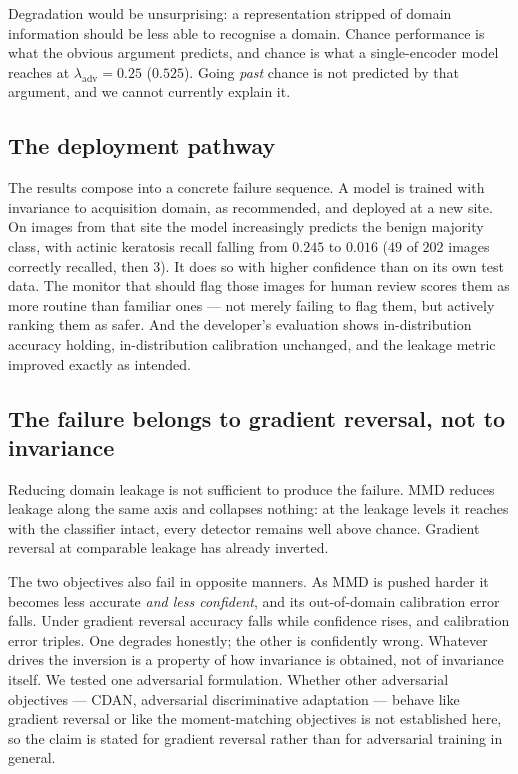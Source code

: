 \documentclass[11pt,a4paper]{article}
\newcommand{\lam}{\lambda_{\mathrm{adv}}}
\newcommand{\nAK}{202}      %
\begin{document}
Degradation would be unsurprising: a representation stripped of domain
information should be less able to recognise a domain. Chance performance is
what the obvious argument predicts, and chance is what a single-encoder model
reaches at $\lam = 0.25$ ($0.525$). Going \emph{past} chance is not predicted by
that argument, and we cannot currently explain it.

\subsection{The deployment pathway}

The results compose into a concrete failure sequence. A model is trained with
invariance to acquisition domain, as recommended, and deployed at a new site. On
images from that site the model increasingly predicts the benign majority class,
with actinic keratosis recall falling from $0.245$ to $0.016$ ($49$ of $\nAK$
images correctly recalled, then $3$). It does so with higher confidence than on
its own test data. The monitor that should flag those images for human review
scores them as more routine than familiar ones --- not merely failing to flag
them, but actively ranking them as safer. And the developer's evaluation shows
in-distribution accuracy holding, in-distribution calibration unchanged, and the
leakage metric improved exactly as intended.

\subsection{The failure belongs to gradient reversal, not to invariance}

Reducing domain leakage is not sufficient to produce the failure. MMD reduces
leakage along the same axis and collapses nothing: at the leakage levels it
reaches with the classifier intact, every detector remains well above chance.
Gradient reversal at comparable leakage has already inverted.

The two objectives also fail in opposite manners. As MMD is pushed harder it
becomes less accurate \emph{and less confident}, and its out-of-domain
calibration error falls. Under gradient reversal accuracy falls while confidence
rises, and calibration error triples. One degrades honestly; the other is
confidently wrong. Whatever drives the inversion is a property of how invariance is obtained, not of
invariance itself. We tested one adversarial formulation. Whether other adversarial
objectives --- CDAN, adversarial discriminative adaptation --- behave like gradient
reversal or like the moment-matching objectives is not established here, so the claim
is stated for gradient reversal rather than for adversarial training in general.
\end{document}
